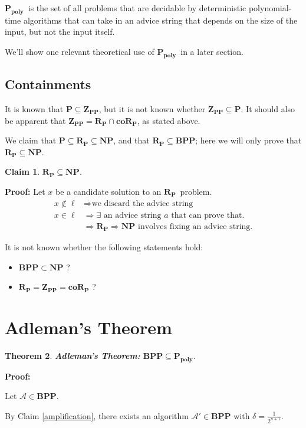\documentclass[11pt]{article}
\newcommand{\Pt}{\ensuremath{\mathbf{P}}}
\newcommand{\NP}{\ensuremath{\mathbf{NP}}}
\newcommand{\BPP}{\ensuremath{\mathbf{BPP}}}
\newcommand{\ZPP}{\ensuremath{\mathbf{Z_{PP}}}}
\newcommand{\RP}{\ensuremath{\mathbf{R_{P}}}}
\newcommand{\coRP}{\ensuremath{\mathbf{coR_{P}}}}
\newcommand{\Ppoly}{\ensuremath{\mathbf{P_{poly}}}}
\newcommand{\Alg}{\ensuremath{\mathcal{A}}}
\newtheorem{theorem}{Theorem}
\newtheorem{claim}[theorem]{Claim}
\begin{document}
\Ppoly\ is the set of all problems that are decidable by deterministic polynomial-time algorithms that can take in an advice string that depends on the size of the input, but not the input itself.

We'll show one relevant theoretical use of \Ppoly\ in a later section.

\subsection{Containments}

It is known that $\Pt\subseteq\ZPP$, but it is not known whether $\ZPP\subseteq\Pt$.
It should also be apparent that $\ZPP = \RP\cap\coRP$, as stated above.

We claim that $\Pt\subseteq\RP\subseteq\NP$, and that $\RP\subseteq\BPP$; here we will only prove that $\RP\subseteq\NP$.

\begin{claim}
$\RP \subseteq \NP$.
\end{claim}
\textbf{Proof:} Let $x$ be a candidate solution to an \RP\ problem.
\begin{align*}
  x\notin\ell &\Rightarrow \text{we discard the advice string}\\
  x\in\ell &\Rightarrow \exists\text{ an advice string $a$ that can prove that.}\\
  &\Rightarrow \RP \Rightarrow \NP \text{ involves fixing an advice string.}
\end{align*}

It is not known whether the following statements hold:

\begin{itemize}
  \item $\BPP\subset\NP$ ?
  \item $\RP=\ZPP=\coRP$ ?
\end{itemize}

\section{Adleman's Theorem}

\begin{theorem}
\textbf{Adleman's Theorem:} $\BPP\subseteq\Ppoly$.
\end{theorem}

\textbf{Proof:}

Let $\Alg\in\BPP$.

By Claim \ref{amplification}, there exists an algorithm $\Alg' \in \BPP$ with $\delta = \frac{1}{2^{n+1}}$.
\end{document}
